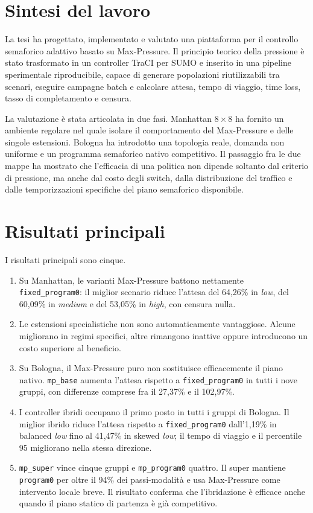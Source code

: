 \documentclass[12pt,a4paper,oneside]{report}
\numberwithin{equation}{chapter}
\begin{document}
\section{Sintesi del lavoro}

La tesi ha progettato, implementato e valutato una piattaforma per il controllo
semaforico adattivo basato su Max-Pressure. Il principio teorico della
pressione è stato trasformato in un controller TraCI per SUMO e inserito in una
pipeline sperimentale riproducibile, capace di generare popolazioni
riutilizzabili tra scenari, eseguire campagne batch e calcolare attesa, tempo
di viaggio, time loss, tasso di completamento e censura.

La valutazione è stata articolata in due fasi. Manhattan \(8\times8\) ha
fornito un ambiente regolare nel quale isolare il comportamento del
Max-Pressure e delle singole estensioni. Bologna ha introdotto una topologia
reale, domanda non uniforme e un programma semaforico nativo competitivo. Il
passaggio fra le due mappe ha mostrato che l'efficacia di una politica non
dipende soltanto dal criterio di pressione, ma anche dal costo degli switch,
dalla distribuzione del traffico e dalle temporizzazioni specifiche del piano
semaforico disponibile.

\section{Risultati principali}

I risultati principali sono cinque.

\begin{enumerate}
    \item Su Manhattan, le varianti Max-Pressure battono nettamente
    \texttt{fixed\_program0}: il miglior scenario riduce l'attesa del
    64,26\% in \emph{low}, del 60,09\% in \emph{medium} e del 53,05\% in \emph{high}, con
    censura nulla.
    \item Le estensioni specialistiche non sono automaticamente vantaggiose.
    Alcune migliorano in regimi specifici, altre rimangono inattive oppure
    introducono un costo superiore al beneficio.
    \item Su Bologna, il Max-Pressure puro non sostituisce efficacemente il
    piano nativo. \texttt{mp\_base} aumenta l'attesa rispetto a
    \texttt{fixed\_program0} in tutti i nove gruppi, con differenze comprese
    fra il 27,37\% e il 102,97\%.
    \item I controller ibridi occupano il primo posto in tutti i gruppi di
    Bologna. Il miglior ibrido riduce l'attesa rispetto a
    \texttt{fixed\_program0} dall'1,19\%
    in balanced \emph{low} fino al 41,47\% in skewed \emph{low}; il tempo di viaggio e il
    percentile 95 migliorano nella stessa direzione.
    \item \texttt{mp\_super} vince cinque gruppi e
    \texttt{mp\_program0} quattro. Il super mantiene \texttt{program0} per
    oltre il 94\% dei passi-modalità e usa Max-Pressure come intervento
    locale breve. Il risultato conferma che l'ibridazione è efficace anche
    quando il piano statico di partenza è già competitivo.
\end{enumerate}
\end{document}

